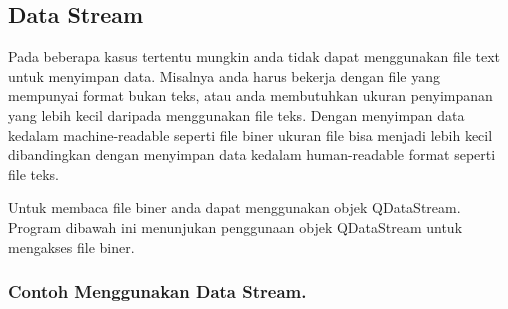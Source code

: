 \subsection{Data Stream}\label{data-stream}

Pada beberapa kasus tertentu mungkin anda tidak dapat menggunakan file
text untuk menyimpan data. Misalnya anda harus bekerja dengan file yang
mempunyai format bukan teks, atau anda membutuhkan ukuran penyimpanan
yang lebih kecil daripada menggunakan file teks. Dengan menyimpan data
kedalam machine-readable seperti file biner ukuran file bisa menjadi
lebih kecil dibandingkan dengan menyimpan data kedalam human-readable
format seperti file teks.

Untuk membaca file biner anda dapat menggunakan objek QDataStream.
Program dibawah ini menunjukan penggunaan objek QDataStream untuk
mengakses file biner.

\subsubsection*{Contoh  Menggunakan Data Stream.}

